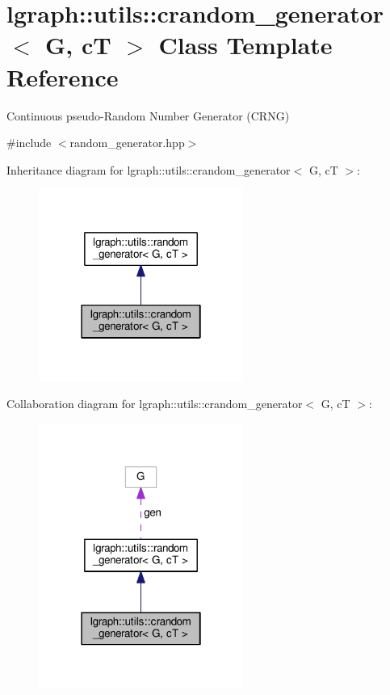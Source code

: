 \hypertarget{classlgraph_1_1utils_1_1crandom__generator}{}\section{lgraph\+:\+:utils\+:\+:crandom\+\_\+generator$<$ G, cT $>$ Class Template Reference}
\label{classlgraph_1_1utils_1_1crandom__generator}


Continuous pseudo-\/\+Random Number Generator (C\+R\+NG)  




{\ttfamily \#include $<$random\+\_\+generator.\+hpp$>$}



Inheritance diagram for lgraph\+:\+:utils\+:\+:crandom\+\_\+generator$<$ G, cT $>$\+:\nopagebreak
\begin{figure}[H]
\begin{center}
\leavevmode
\includegraphics[width=190pt]{classlgraph_1_1utils_1_1crandom__generator__inherit__graph}
\end{center}
\end{figure}


Collaboration diagram for lgraph\+:\+:utils\+:\+:crandom\+\_\+generator$<$ G, cT $>$\+:\nopagebreak
\begin{figure}[H]
\begin{center}
\leavevmode
\includegraphics[width=190pt]{classlgraph_1_1utils_1_1crandom__generator__coll__graph}
\end{center}
\end{figure}
